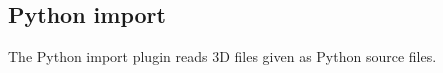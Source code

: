 
\subsection{Python import}

The Python import plugin reads 3D files given as Python source files.

